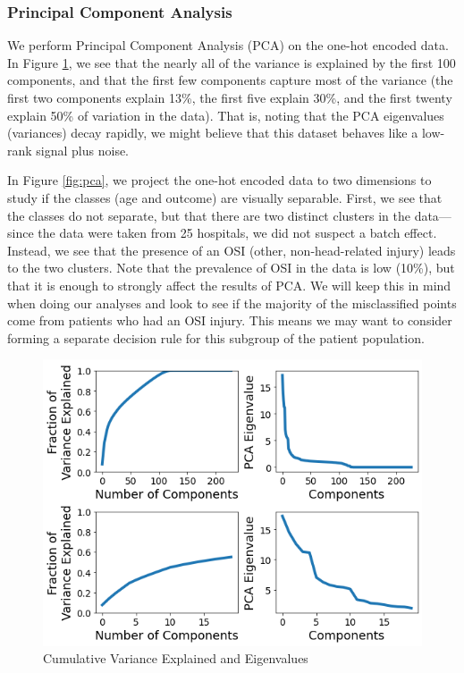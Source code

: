 \documentclass[11pt]{amsart}
\begin{document}
\subsubsection{Principal Component Analysis}

We perform Principal Component Analysis (PCA) on the one-hot encoded data. In Figure \ref{fig:pca_cum_var}, we see that the nearly all of the variance is explained by the first 100 components, and that the first few components capture most of the variance (the first two components explain 13\%, the first five explain 30\%, and the first twenty explain 50\% of variation in the data). That is, noting that the PCA eigenvalues (variances) decay rapidly, we might believe that this dataset behaves like a low-rank signal plus noise. 

In Figure \ref{fig:pca}, we project the one-hot encoded data to two dimensions to study if the classes (age and outcome) are visually separable. First, we see that the classes do not separate, but that there are two distinct clusters in the data---since the data were taken from 25 hospitals, we did not suspect a batch effect. Instead, we see that the presence of an OSI (other, non-head-related injury) leads to the two clusters. Note that the prevalence of OSI in the data is low (10\%), but that it is enough to strongly affect the results of PCA. We will keep this in mind when doing our analyses and look to see if the majority of the misclassified points come from patients who had an OSI injury. This means we may want to consider forming a separate decision rule for this subgroup of the patient population.
\FloatBarrier
\begin{figure}
	\centering
	\includegraphics[width=\textwidth]{pca_cum_var.png}
	\caption{Cumulative Variance Explained and Eigenvalues}\label{fig:pca_cum_var}
\end{figure}
\end{document}
